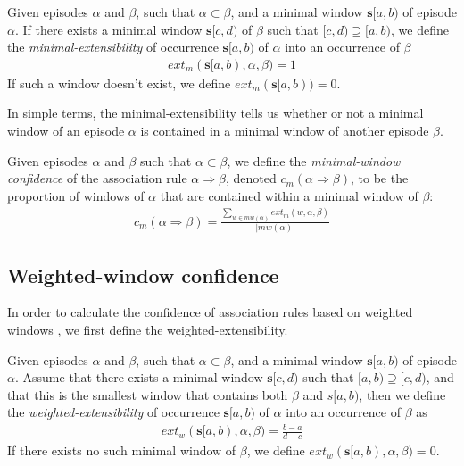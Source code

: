\begin{definition}
Given episodes $ \alpha $ and $ \beta $, such that $ \alpha \subset \beta $, and a minimal window $ \boldsymbol{s}[a, b) $ of episode $ \alpha $. If there exists a minimal window $ \boldsymbol{s}[c, d) $ of $ \beta $ such that
$ [c, d) \supseteq [a, b) $, we define the \emph{minimal-extensibility} of occurrence $ \boldsymbol{s}[a, b) $ of $ \alpha $ into an occurrence of $ \beta $
\begin{align*}
ext_m(\boldsymbol{s}[a, b), \alpha, \beta) = 1
\end{align*}
If such a window doesn't exist, we define $ ext_m(\boldsymbol{s}[a,b)) = 0 $.
\end{definition}

In simple terms, the minimal-extensibility tells us whether or not a minimal window of an episode $ \alpha $ is contained in a minimal window of another episode $ \beta $.

\begin{definition}
Given episodes $ \alpha $ and $ \beta $ such that $ \alpha \subset \beta $, we define the \emph{minimal-window confidence} of the association rule $ \alpha \Rightarrow \beta $, denoted $ c_m(\alpha \Rightarrow \beta) $, to be the proportion of windows of $ \alpha $ that are contained within a minimal window of $ \beta $:
\begin{align*}
c_m(\alpha \Rightarrow \beta) = \frac{\sum_{w \in mw(\alpha)} ext_m(w, \alpha, \beta)}{| mw(\alpha) |}
\end{align*}
\end{definition}

\subsection{Weighted-window confidence}

In order to calculate the confidence of association rules based on weighted windows \citep{cule2014marbles}, we first define the weighted-extensibility.

\begin{definition} \label{def:weighted-extensibility}
Given episodes $ \alpha $ and $ \beta $, such that $ \alpha \subset \beta $, and a minimal window $ \boldsymbol{s}[a, b) $ of episode $ \alpha $. Assume that there exists a minimal window $ \boldsymbol{s}[c, d) $ such that $ [a, b) \supseteq [c, d) $, and that this is the smallest window that contains both $ \beta $ and $ s[a, b) $, then we define the \emph{weighted-extensibility} of occurrence $ \boldsymbol{s}[a, b) $ of $ \alpha $ into an occurrence of $ \beta $ as
\begin{align*}
ext_w(\boldsymbol{s}[a, b), \alpha, \beta) = \frac{b - a}{d - c}
\end{align*}
If there exists no such minimal window of $ \beta $, we define $ ext_w(\boldsymbol{s}[a, b), \alpha, \beta) = 0 $.
\end{definition}

